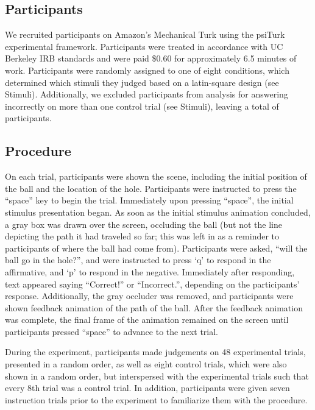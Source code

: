 \documentclass[10pt,letterpaper]{article}
\begin{document}
\subsection{Participants}

We recruited \HoleNumComplete{} participants on Amazon's Mechanical Turk using the psiTurk \cite{McDonnell12} experimental framework. Participants were treated in accordance with UC Berkeley IRB standards and were paid \$0.60 for approximately 6.5 minutes of work. Participants were randomly assigned to one of eight conditions, which determined which stimuli they judged based on a latin-square design (see Stimuli). Additionally, we excluded \HoleNumFailed{} participants from analysis for answering incorrectly on more than one control trial (see Stimuli), leaving a total of \HoleNumOk{} participants.

\subsection{Procedure}

On each trial, participants were shown the scene, including the initial position of the ball and the location of the hole. Participants were instructed to press the ``space'' key to begin the trial. Immediately upon pressing ``space'', the initial stimulus presentation began. As soon as the initial stimulus animation concluded, a gray box was drawn over the screen, occluding the ball (but not the line depicting the path it had traveled so far; this was left in as a reminder to participants of where the ball had come from). Participants were asked, ``will the ball go in the hole?'', and were instructed to press `q' to respond in the affirmative, and `p' to respond in the negative. Immediately after responding, text appeared saying ``Correct!'' or ``Incorrect.'', depending on the participants' response. Additionally, the gray occluder was removed, and participants were shown feedback animation of the path of the ball. After the feedback animation was complete, the final frame of the animation remained on the screen until participants pressed ``space'' to advance to the next trial. 

During the experiment, participants made judgements on 48 experimental trials, presented in a random order, as well as eight control trials, which were also shown in a random order, but interspersed with the experimental trials such that every 8th trial was a control trial. In addition, participants were given seven instruction trials prior to the experiment to familiarize them with the procedure.
\end{document}
